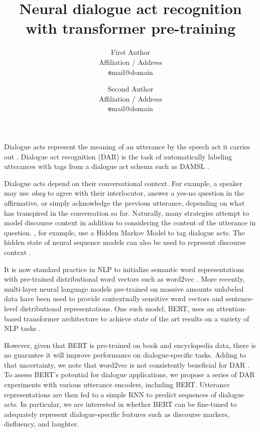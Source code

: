\documentclass[11pt,a4paper,headings=standardclasses]{article}
\title{Neural dialogue act recognition with transformer pre-training} %
\author{
  First Author \\
  Affiliation / Address \\
  {\texttt email@domain} \\\and
  Second Author \\
  Affiliation / Address \\
  {\texttt email@domain} \\
}
\date{}
\begin{document}
\maketitle

Dialogue acts represent the meaning of an utterance by the speech act it carries out \citep{austinHowThingsWords2009}.
Dialogue act recognition (DAR) is the task of automatically labeling utterances with tags from a dialogue act schema such as DAMSL \citep{coreCodingDialogsDAMSL1997}.

Dialogue acts depend on their conversational context.
For example, a speaker may use \textit{okay} to agree with their interlocutor, answer a yes-no question in the affirmative, 
or simply acknowledge the previous utterance, depending on what has transpired in the conversation so far.
Naturally, many strategies attempt to model discourse context in addition to considering the content of the utterance in question.
\cite{stolckeDialogueActModeling2000}, for example, use a Hidden Markov Model to tag dialogue acts.
The hidden state of neural sequence models can also be used to represent discourse context 
\citep[e.g.][]{kalchbrennerRecurrentConvolutionalNeural2013,tranPreservingDistributionalInformation2017}.


It is now standard practice in NLP to initialize semantic word representations
with pre-trained distributional word vectors such as word2vec \citep{mikolov2013distributed}.
More recently, multi-layer neural language models pre-trained on massive amounts unlabeled data
have been used to provide contextually sensitive word vectors and sentence-level distributional representations.
One such model, BERT, uses an attention-based transformer architecture to achieve state of the art results
on a variety of NLP tasks \citep{devlinBERTPretrainingDeep2018}.

However, given that BERT is pre-trained on book and encyclopedia data, 
there is no guarantee it will improve performance on dialogue-specific tasks.
Adding to that uncertainty, we note that word2vec is not consistently beneficial for DAR \citep{cerisaraEffectsUsingWord2vec2017}.
To assess BERT's potential for dialogue applications, we propose a series of DAR experiments 
with various utterance encoders, including BERT.
Utterance representations are then fed to a simple RNN to predict sequences of dialogue acts.
In particular, we are interested in whether BERT can be fine-tuned to adequately represent
dialogue-specific features such as discourse markers, disfluency, and laughter.
\end{document}
